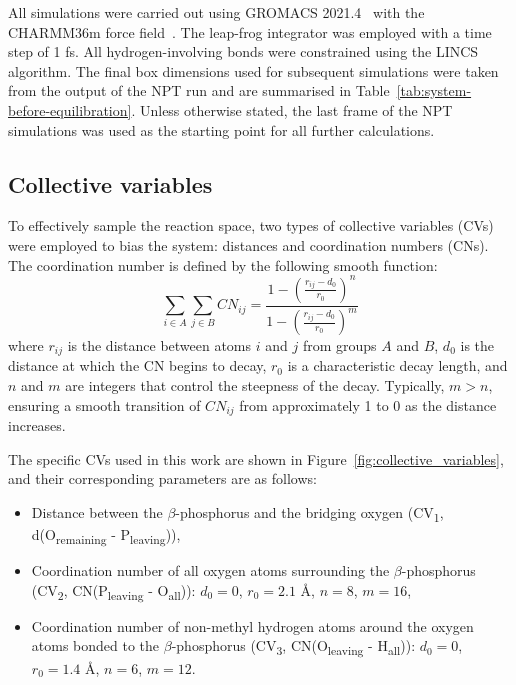 All simulations were carried out using GROMACS 2021.4~\citep{abrahamGROMACSHighPerformance2015} with the CHARMM36m force field~\citep{huangCHARMM36mImprovedForce2017}. The leap-frog integrator was employed with a time step of 1 fs. All hydrogen-involving bonds were constrained using the LINCS algorithm. The final box dimensions used for subsequent simulations were taken from the output of the NPT run and are summarised in Table~\ref{tab:system-before-equilibration}. Unless otherwise stated, the last frame of the NPT simulations was used as the starting point for all further calculations.



\subsection{Collective variables}
To effectively sample the reaction space, two types of collective variables (CVs) were employed to bias the system: distances and coordination numbers (CNs). The coordination number is defined by the following smooth function:
\begin{equation}
    \sum_{i \in A} \sum_{j \in B} CN_{ij} = \frac{1 - \left( \frac{r_{ij} - d_0}{r_0} \right)^n}{1 - \left( \frac{r_{ij} - d_0}{r_0} \right)^m}
    \label{eq:coordination_number}
\end{equation}
where $r_{ij}$ is the distance between atoms $i$ and $j$ from groups $A$ and $B$, $d_0$ is the distance at which the CN begins to decay, $r_0$ is a characteristic decay length, and $n$ and $m$ are integers that control the steepness of the decay. Typically, $m > n$, ensuring a smooth transition of $CN_{ij}$ from approximately 1 to 0 as the distance increases.

The specific CVs used in this work are shown in Figure~\ref{fig:collective_variables}, and their corresponding parameters are as follows:

\begin{itemize}
    \item Distance between the $\beta$-phosphorus and the bridging oxygen (CV\textsubscript{1}, d(O\textsubscript{remaining} - P\textsubscript{leaving})),
    \item Coordination number of all oxygen atoms surrounding the $\beta$-phosphorus (CV\textsubscript{2}, CN(P\textsubscript{leaving} - O\textsubscript{all})): $d_0 = 0$, $r_0 = 2.1$ \AA, $n = 8$, $m = 16$,
    \item Coordination number of non-methyl hydrogen atoms around the oxygen atoms bonded to the $\beta$-phosphorus (CV\textsubscript{3}, CN(O\textsubscript{leaving} - H\textsubscript{all})): $d_0 = 0$, $r_0 = 1.4$ \AA, $n = 6$, $m = 12$.
\end{itemize}

